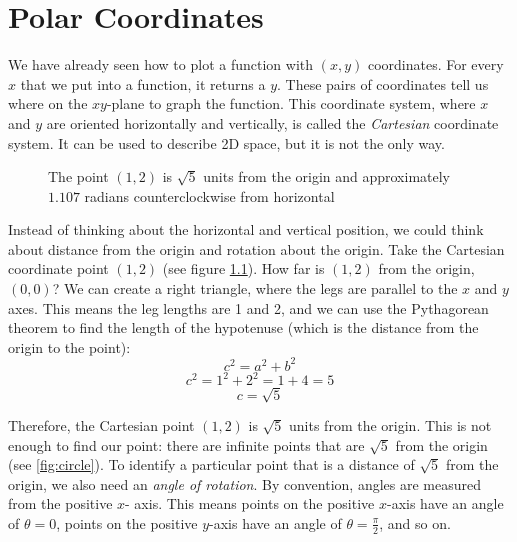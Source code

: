 \chapter{Polar Coordinates}

We have already seen how to plot a function with $(x,y)$ coordinates. For 
every $x$ that we put into a function, it returns a $y$. These pairs of 
coordinates tell us where on the $xy$-plane to graph the function. This 
coordinate system, where $x$ and $y$ are oriented horizontally and vertically, 
is called the \textit{Cartesian} coordinate system. It can be used to describe 
2D space, but it is not the only way. 

\begin{figure}[htbp]
\centering
    \caption{The point $(1, 2)$ is $\sqrt{5}$ units from the origin and 
    approximately $1.107$ radians counterclockwise from horizontal}
    \label{fig:cartesian}
    \end{figure}

Instead of thinking about the horizontal and vertical position, we could think 
about distance from the origin and rotation about the origin. Take the 
Cartesian coordinate point $(1, 2)$ (see figure \ref{fig:cartesian}). How far is 
$(1,2)$ from the origin, $(0,0)$? We can create a right triangle, where the 
legs are parallel to the $x$ and $y$ axes. This means the leg lengths are 1 and 2, 
and we can use the Pythagorean theorem to find the length of the hypotenuse 
(which is the distance from the origin to the point):
$$c^2 = a^2 + b^2$$
$$c^2 = 1^2 + 2^2 = 1 + 4 = 5$$
$$c = \sqrt{5}$$

Therefore, the Cartesian point $(1, 2)$ is $\sqrt{5}$ units from the origin. 
This is not enough to find our point: there are infinite points that are 
$\sqrt{5}$ from the origin (see \ref{fig:circle}). To identify a particular point 
that is a distance of $\sqrt{5}$ from the origin, we also need an \textit{
angle of rotation}. By convention, angles are measured from the positive $x$-
axis. This means points on the positive $x$-axis have an angle of $\theta = 
0$, points on the positive $y$-axis have an angle of $\theta = \frac{\pi}{2}$, 
and so on. 


